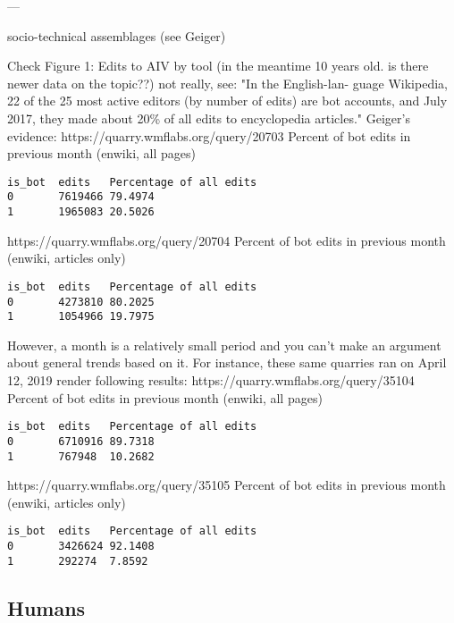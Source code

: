 ---

socio-technical assemblages (see Geiger)

\cite{GeiRib2010}
Check Figure 1: Edits to AIV by tool (in the meantime 10 years old. is there newer data on the topic??)
not really, see:
\cite{Geiger2017}
"In the English-lan-
guage Wikipedia, 22 of the 25 most active editors (by
number of edits) are bot accounts, and July 2017, they
made about 20\% of all edits to encyclopedia articles."
Geiger's evidence:
https://quarry.wmflabs.org/query/20703
Percent of bot edits in previous month (enwiki, all pages)
\begin{verbatim}
is_bot	edits	Percentage of all edits
0	    7619466	79.4974
1	    1965083	20.5026
\end{verbatim}

https://quarry.wmflabs.org/query/20704
Percent of bot edits in previous month (enwiki, articles only)
\begin{verbatim}
is_bot	edits	Percentage of all edits
0	    4273810	80.2025
1	    1054966	19.7975
\end{verbatim}

However, a month is a relatively small period and you can't make an argument about general trends based on it.
For instance, these same quarries ran on April 12, 2019 render following results:
https://quarry.wmflabs.org/query/35104
Percent of bot edits in previous month (enwiki, all pages)
\begin{verbatim}
is_bot	edits	Percentage of all edits
0	    6710916	89.7318
1	    767948	10.2682
\end{verbatim}

https://quarry.wmflabs.org/query/35105
Percent of bot edits in previous month (enwiki, articles only)
\begin{verbatim}
is_bot	edits	Percentage of all edits
0	    3426624	92.1408
1	    292274	7.8592
\end{verbatim}


\subsection{Humans}

